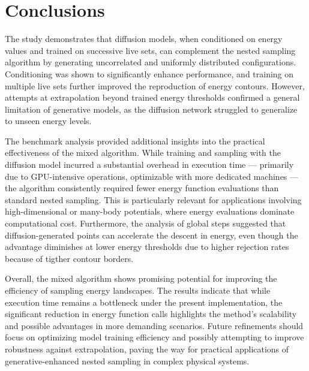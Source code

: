 \documentclass[a4paper, 12pt]{article}          %
\begin{document}
\section{Conclusions}

The study demonstrates that diffusion models, when conditioned on energy values and trained on successive live sets, can complement the nested sampling algorithm by generating uncorrelated and uniformly distributed configurations. Conditioning was shown to significantly enhance performance, and training on multiple live sets further improved the reproduction of energy contours. However, attempts at extrapolation beyond trained energy thresholds confirmed a general limitation of generative models, as the diffusion network struggled to generalize to unseen energy levels.

The benchmark analysis provided additional insights into the practical effectiveness of the mixed algorithm. While training and sampling with the diffusion model incurred a substantial overhead in execution time — primarily due to GPU-intensive operations, optimizable with more dedicated machines — the algorithm consistently required fewer energy function evaluations than standard nested sampling. This is particularly relevant for applications involving high-dimensional or many-body potentials, where energy evaluations dominate computational cost. Furthermore, the analysis of global steps suggested that diffusion-generated points can accelerate the descent in energy, even though the advantage diminishes at lower energy thresholds due to higher rejection rates because of tigther contour borders.

Overall, the mixed algorithm shows promising potential for improving the efficiency of sampling energy landscapes. The results indicate that while execution time remains a bottleneck under the present implementation, the significant reduction in energy function calls highlights the method's scalability and possible advantages in more demanding scenarios. Future refinements should focus on optimizing model training efficiency and possibly attempting to improve robustness against extrapolation, paving the way for practical applications of generative-enhanced nested sampling in complex physical systems.



\newpage  
\end{document}
